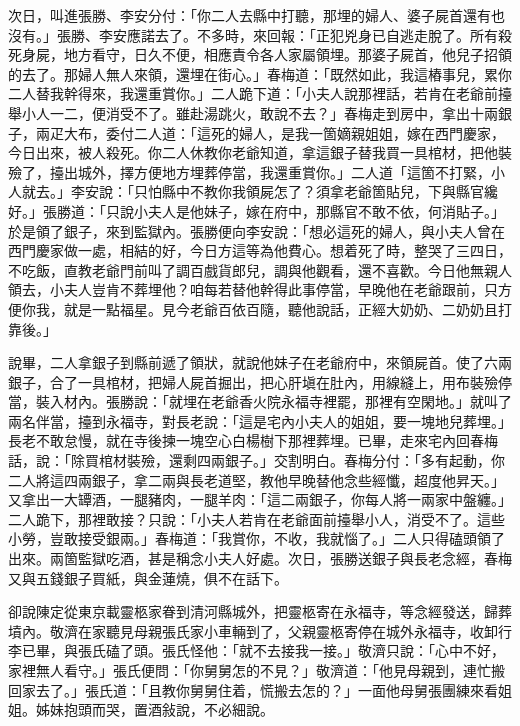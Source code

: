 次日，叫進張勝、李安分付：「你二人去縣中打聽，那埋的婦人、婆子屍首還有也沒有。」張勝、李安應諾去了。不多時，來回報：「正犯兇身已自逃走脫了。所有殺死身屍，地方看守，日久不便，相應責令各人家屬領埋。那婆子屍首，他兒子招領的去了。那婦人無人來領，還埋在街心。」春梅道：「既然如此，我這樁事兒，累你二人替我幹得來，我還重賞你。」二人跪下道：「小夫人說那裡話，若肯在老爺前擡舉小人一二，便消受不了。雖赴湯跳火，敢說不去？」春梅走到房中，拿出十兩銀子，兩疋大布，委付二人道：「這死的婦人，是我一箇嫡親姐姐，嫁在西門慶家，今日出來，被人殺死。你二人休教你老爺知道，拿這銀子替我買一具棺材，把他裝殮了，擡出城外，擇方便地方埋葬停當，我還重賞你。」二人道「這箇不打緊，小人就去。」李安說：「只怕縣中不教你我領屍怎了？須拿老爺箇貼兒，下與縣官纔好。」張勝道：「只說小夫人是他妹子，嫁在府中，那縣官不敢不依，何消貼子。」於是領了銀子，來到監獄內。張勝便向李安說：「想必這死的婦人，與小夫人曾在西門慶家做一處，相結的好，今日方這等為他費心。想着死了時，整哭了三四日，不吃飯，直教老爺門前叫了調百戲貨郎兒，調與他觀看，還不喜歡。今日他無親人領去，小夫人豈肯不葬埋他？咱每若替他幹得此事停當，早晚他在老爺跟前，只方便你我，就是一點福星。{}見今老爺百依百隨，聽他說話，正經大奶奶、二奶奶且打靠後。」

說畢，二人拿銀子到縣前遞了領狀，就說他妹子在老爺府中，來領屍首。使了六兩銀子，合了一具棺材，把婦人屍首掘出，把心肝塡在肚內，用線縫上，用布裝殮停當，裝入材內。{}張勝說：「就埋在老爺香火院永福寺裡罷，那裡有空閑地。」就叫了兩名伴當，擡到永福寺，對長老說：「這是宅內小夫人的姐姐，要一塊地兒葬埋。」長老不敢怠慢，就在寺後揀一塊空心白楊樹下那裡葬埋。已畢，走來宅內回春梅話，說：「除買棺材裝殮，還剩四兩銀子。」交割明白。春梅分付：「多有起動，你二人將這四兩銀子，拿二兩與長老道堅，教他早晚替他念些經懺，超度他昇天。」又拿出一大罈酒，一腿豬肉，一腿羊肉：「這二兩銀子，你每人將一兩家中盤纏。」二人跪下，那裡敢接？只說：「小夫人若肯在老爺面前擡舉小人，消受不了。這些小勞，豈敢接受銀兩。」春梅道：「我賞你，不收，我就惱了。」二人只得磕頭領了出來。兩箇監獄吃酒，甚是稱念小夫人好處。{}次日，張勝送銀子與長老念經，春梅又與五錢銀子買紙，與金蓮燒，俱不在話下。

卻說陳定從東京載靈柩家眷到清河縣城外，把靈柩寄在永福寺，等念經發送，歸葬墳內。敬濟在家聽見母親張氏家小車輛到了，父親靈柩寄停在城外永福寺，收卸行李已畢，與張氏磕了頭。張氏怪他：「就不去接我一接。」{}敬濟只說：「心中不好，家裡無人看守。」張氏便問：「你舅舅怎的不見？」敬濟道：「他見母親到，連忙搬回家去了。」張氏道：「且教你舅舅住着，慌搬去怎的？」一面他母舅張團練來看姐姐。姊妹抱頭而哭，置酒敍說，不必細說。

